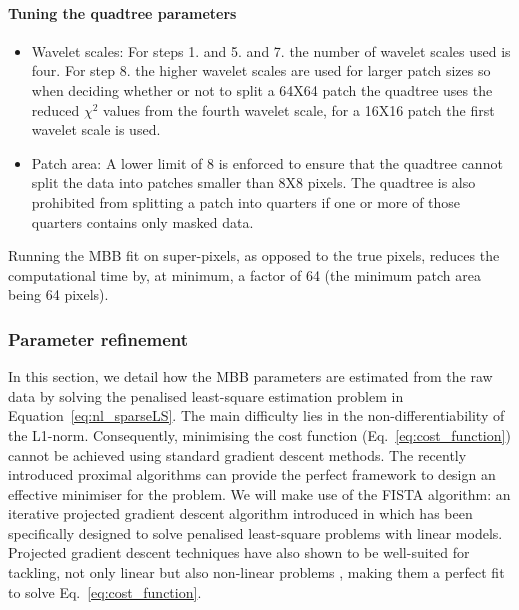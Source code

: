 \documentclass[a4paper,fleqn,usenatbib]{mnras}
\begin{document}
\paragraph*{Tuning the quadtree parameters}
\begin{itemize}[label={--}]
\item{Wavelet scales:} For steps 1. and 5. and 7. the number of wavelet scales used is four. For step 8. the higher wavelet scales are used for larger patch sizes so when deciding whether or not to split a 64X64 patch the quadtree uses the reduced $\chi^{2}$ values from the fourth wavelet scale, for a 16X16 patch the first wavelet scale is used. \\

\item{Patch area:} A lower limit of 8 is enforced to ensure that the quadtree cannot split the data into patches smaller than 8X8 pixels. The quadtree is also prohibited from splitting a patch into quarters if one or more of those quarters contains only masked data.
\end{itemize}

\quad 

Running the MBB fit on super-pixels, as opposed to the true pixels, reduces the computational time by, at minimum, a factor of 64 (the minimum patch area being 64 pixels).  

\subsubsection{Parameter refinement} \label{parref}

In this section, we detail how the MBB parameters are estimated from the raw data by solving the penalised least-square estimation problem in Equation~\ref{eq:nl_sparseLS}. The main difficulty lies in the non-differentiability of the L1-norm. Consequently, minimising the cost function (Eq.~\ref{eq:cost_function}) cannot be achieved using standard gradient descent methods. The recently introduced proximal algorithms \citep{parikh2014proximal} can provide the perfect framework to design an effective minimiser for the problem. We will make use of the FISTA algorithm: an iterative projected gradient descent algorithm introduced in \citet{beck2009fast} which has been specifically designed to solve penalised least-square problems with linear models. Projected gradient descent techniques have also shown to be well-suited for tackling, not only linear but also non-linear problems \citep{teschke09}, making them a perfect fit to solve Eq.~\ref{eq:cost_function}.
\end{document}
